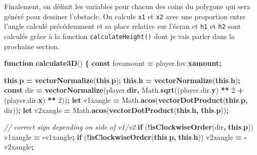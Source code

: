 \documentclass[11pt,french,a4paper,]{article}
\newenvironment{Shaded}{\begin{snugshade}}{\end{snugshade}}
\newcommand{\AttributeTok}[1]{\textcolor[rgb]{0.00,0.36,0.77}{\textbf{#1}}}
\newcommand{\CommentTok}[1]{\textcolor[rgb]{0.35,0.35,0.35}{\textit{#1}}}
\newcommand{\ControlFlowTok}[1]{\textcolor[rgb]{0.68,0.35,0.62}{\textbf{#1}}}
\newcommand{\DecValTok}[1]{\textcolor[rgb]{0.00,0.00,0.81}{#1}}
\newcommand{\KeywordTok}[1]{\textcolor[rgb]{0.68,0.35,0.62}{\textbf{#1}}}
\newcommand{\NormalTok}[1]{#1}
\newcommand{\OperatorTok}[1]{\textcolor[rgb]{0.81,0.36,0.00}{\textbf{#1}}}
\newcommand{\VariableTok}[1]{\textcolor[rgb]{0.90,0.33,0.00}{#1}}
\begin{document}
Finalement, on définit les variables pour chacun des coins du polygone
qui sera généré pour dessiner l'obstacle. On calcule \texttt{x1} et
\texttt{x2} avec une proportion entre l'angle calculé précédemment et sa
place relative sur l'écran et \texttt{h1} et \texttt{h2} sont calculés
grâce à la fonction \texttt{calculateHeight()} dont je vais parler dans
la prochaine section.

\begin{Shaded}
\begin{Highlighting}[]
\KeywordTok{function} \AttributeTok{calculate3D}\NormalTok{() }\OperatorTok{\{}
    \KeywordTok{const}\NormalTok{ fovamount }\OperatorTok{=} \VariableTok{player}\NormalTok{.}\VariableTok{fov}\NormalTok{.}\AttributeTok{xamount}\OperatorTok{;}

    \KeywordTok{this}\NormalTok{.}\AttributeTok{p} \OperatorTok{=} \AttributeTok{vectorNormalize}\NormalTok{(}\KeywordTok{this}\NormalTok{.}\AttributeTok{p}\NormalTok{)}\OperatorTok{;}
    \KeywordTok{this}\NormalTok{.}\AttributeTok{h} \OperatorTok{=} \AttributeTok{vectorNormalize}\NormalTok{(}\KeywordTok{this}\NormalTok{.}\AttributeTok{h}\NormalTok{)}\OperatorTok{;}
    \KeywordTok{const}\NormalTok{ dir }\OperatorTok{=} \AttributeTok{vectorNormalize}\NormalTok{(}\VariableTok{player}\NormalTok{.}\AttributeTok{dir}\OperatorTok{,}
                    \VariableTok{Math}\NormalTok{.}\AttributeTok{sqrt}\NormalTok{((}\VariableTok{player}\NormalTok{.}\VariableTok{dir}\NormalTok{.}\AttributeTok{y}\NormalTok{) }\OperatorTok{**} \DecValTok{2} \OperatorTok{+}\NormalTok{ (}\VariableTok{player}\NormalTok{.}\VariableTok{dir}\NormalTok{.}\AttributeTok{x}\NormalTok{) }\OperatorTok{**} \DecValTok{2}\NormalTok{))}\OperatorTok{;}
    \KeywordTok{let}\NormalTok{ v1xangle }\OperatorTok{=} \VariableTok{Math}\NormalTok{.}\AttributeTok{acos}\NormalTok{(}\AttributeTok{vectorDotProduct}\NormalTok{(}\KeywordTok{this}\NormalTok{.}\AttributeTok{p}\OperatorTok{,}\NormalTok{ dir))}\OperatorTok{;}
    \KeywordTok{let}\NormalTok{ v2xangle }\OperatorTok{=} \VariableTok{Math}\NormalTok{.}\AttributeTok{acos}\NormalTok{(}\AttributeTok{vectorDotProduct}\NormalTok{(}\KeywordTok{this}\NormalTok{.}\AttributeTok{h}\OperatorTok{,} \KeywordTok{this}\NormalTok{.}\AttributeTok{p}\NormalTok{))}\OperatorTok{;}

    \CommentTok{// correct sign depending on side of v1/v2        }
    \ControlFlowTok{if}\NormalTok{ (}\OperatorTok{!}\AttributeTok{isClockwiseOrder}\NormalTok{(dir}\OperatorTok{,} \KeywordTok{this}\NormalTok{.}\AttributeTok{p}\NormalTok{)) v1xangle }\OperatorTok{=} \OperatorTok{-}\NormalTok{v1xangle}\OperatorTok{;} 
    \ControlFlowTok{if}\NormalTok{ (}\OperatorTok{!}\AttributeTok{isClockwiseOrder}\NormalTok{(}\KeywordTok{this}\NormalTok{.}\AttributeTok{p}\OperatorTok{,} \KeywordTok{this}\NormalTok{.}\AttributeTok{h}\NormalTok{)) v2xangle }\OperatorTok{=} \OperatorTok{-}\NormalTok{v2xangle}\OperatorTok{;}


\end{Highlighting}
\end{Shaded}
\end{document}
